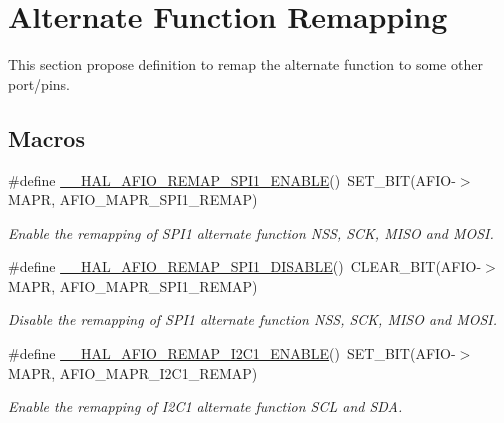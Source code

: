 \hypertarget{group___g_p_i_o_ex___a_f_i_o___a_f___r_e_m_a_p_p_i_n_g}{}\section{Alternate Function Remapping}
\label{group___g_p_i_o_ex___a_f_i_o___a_f___r_e_m_a_p_p_i_n_g}


This section propose definition to remap the alternate function to some other port/pins.  


\subsection*{Macros}
\begin{DoxyCompactItemize}
\item 
\#define \hyperlink{group___g_p_i_o_ex___a_f_i_o___a_f___r_e_m_a_p_p_i_n_g_gab8c66251f12d7d4b574b1257c73b5c70}{\+\_\+\+\_\+\+H\+A\+L\+\_\+\+A\+F\+I\+O\+\_\+\+R\+E\+M\+A\+P\+\_\+\+S\+P\+I1\+\_\+\+E\+N\+A\+B\+LE}()~S\+E\+T\+\_\+\+B\+IT(A\+F\+IO-\/$>$M\+A\+PR, A\+F\+I\+O\+\_\+\+M\+A\+P\+R\+\_\+\+S\+P\+I1\+\_\+\+R\+E\+M\+AP)
\begin{DoxyCompactList}\small\item\em Enable the remapping of S\+P\+I1 alternate function N\+SS, S\+CK, M\+I\+SO and M\+O\+SI. \end{DoxyCompactList}\item 
\#define \hyperlink{group___g_p_i_o_ex___a_f_i_o___a_f___r_e_m_a_p_p_i_n_g_ga8fceca9b4e97561de6d1a9b6deb28550}{\+\_\+\+\_\+\+H\+A\+L\+\_\+\+A\+F\+I\+O\+\_\+\+R\+E\+M\+A\+P\+\_\+\+S\+P\+I1\+\_\+\+D\+I\+S\+A\+B\+LE}()~C\+L\+E\+A\+R\+\_\+\+B\+IT(A\+F\+IO-\/$>$M\+A\+PR, A\+F\+I\+O\+\_\+\+M\+A\+P\+R\+\_\+\+S\+P\+I1\+\_\+\+R\+E\+M\+AP)
\begin{DoxyCompactList}\small\item\em Disable the remapping of S\+P\+I1 alternate function N\+SS, S\+CK, M\+I\+SO and M\+O\+SI. \end{DoxyCompactList}\item 
\#define \hyperlink{group___g_p_i_o_ex___a_f_i_o___a_f___r_e_m_a_p_p_i_n_g_gaa792242eacda833df7db47017594e3ea}{\+\_\+\+\_\+\+H\+A\+L\+\_\+\+A\+F\+I\+O\+\_\+\+R\+E\+M\+A\+P\+\_\+\+I2\+C1\+\_\+\+E\+N\+A\+B\+LE}()~S\+E\+T\+\_\+\+B\+IT(A\+F\+IO-\/$>$M\+A\+PR, A\+F\+I\+O\+\_\+\+M\+A\+P\+R\+\_\+\+I2\+C1\+\_\+\+R\+E\+M\+AP)
\begin{DoxyCompactList}\small\item\em Enable the remapping of I2\+C1 alternate function S\+CL and S\+DA. \end{DoxyCompactList}\item 

\end{DoxyCompactItemize}
